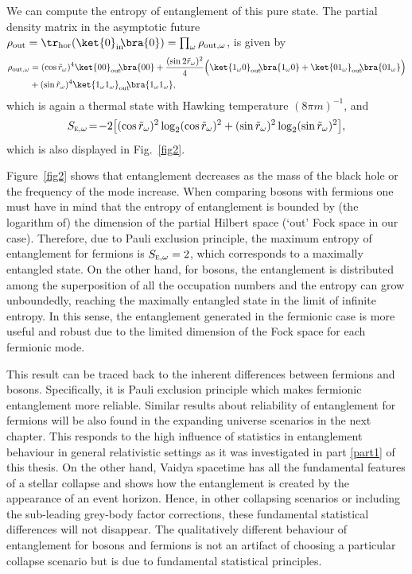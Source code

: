 We can compute the entropy of entanglement of this pure state.
The partial density matrix in the asymptotic future
$\rho_{\text{out}}=\tr_{\text{hor}}(\ket{0}_{\text{in}}\!\!\bra{0})=
\prod_\omega \rho_{\text{out},\omega}$, is given by
\begin{align}
\rho_{\text{out},\omega}&= (\cos\tilde r_\omega)^4
\ket{00}_{\text{out}}\!\!\bra{00}+\frac{(\sin 2\tilde r_\omega)^2}{4}
\Big(\ket{1_{\omega}0}_{\text{out}}\!\!\bra{1_{\omega}0}
+\ket{01_{\omega}}_{\text{out}}\!\!\bra{01_{\omega}}\Big)
\nonumber\\
&+(\sin \tilde r_\omega)^4 \ket{1_{\omega}1_{\omega}}_{\text{out}}\!\!
\bra{1_{\omega}1_{\omega}},
\end{align}
which   is again a thermal state with Hawking temperature $(8\pi
m)^{-1}$, and
\begin{equation}
S_{\textsc{e},\omega}\!=\!-2\big[(\cos \tilde r_\omega)^2\log_2
(\cos \tilde r_\omega)^2+
(\sin \tilde r_\omega)^2\log_2(\sin \tilde r_\omega)^2\big],
\end{equation}
which is also displayed in Fig.~\ref{fig2}.

Figure~\ref{fig2} shows that entanglement decreases as the mass of
the black hole or the frequency of the mode increase. When comparing
bosons with  fermions one must have in mind that the entropy of
entanglement is bounded by (the logarithm of) the dimension of the
partial Hilbert space (`out' Fock space in our case). Therefore, due to
Pauli exclusion principle, the maximum entropy of entanglement for
fermions is $S_{\textsc{e},\omega}=2$, which corresponds to a
maximally entangled state. On the other hand, for bosons, the
entanglement is distributed among the superposition of all the occupation
numbers and the entropy can grow unboundedly, reaching the
maximally entangled state in the limit of infinite entropy. In this sense,
the entanglement generated in the fermionic case is more useful and
robust due to the limited dimension of the Fock space for each fermionic
mode.

This result can be traced back to the inherent differences between
fermions and bosons. Specifically, it is Pauli exclusion principle which
makes fermionic entanglement more reliable.  Similar results about
reliability of entanglement for fermions will be also found in the
expanding universe scenarios in the next chapter.  This responds to the high
influence of statistics in entanglement behaviour in general relativistic
settings as it was investigated in part \ref{part1} of this thesis. On the other hand,
Vaidya spacetime has all the fundamental features of a stellar collapse
and shows how the entanglement is created by the appearance of an
event horizon. Hence, in other collapsing scenarios or including the
sub-leading grey-body factor corrections, these fundamental statistical
differences will not disappear. The qualitatively different behaviour of
entanglement for bosons and fermions is not an artifact of choosing a
particular collapse scenario but is due to fundamental statistical
principles.

